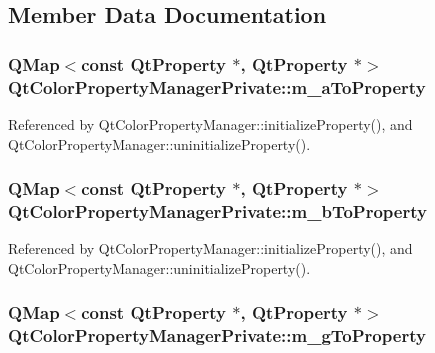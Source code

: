 \subsection{Member Data Documentation}
\subsubsection[{m\+\_\+a\+To\+Property}]{\setlength{\rightskip}{0pt plus 5cm}Q\+Map$<$const {\bf Qt\+Property} $\ast$, {\bf Qt\+Property} $\ast$$>$ Qt\+Color\+Property\+Manager\+Private\+::m\+\_\+a\+To\+Property}\label{classQtColorPropertyManagerPrivate_addd54ffbf9903145e5b3b307a0c8146d}


Referenced by Qt\+Color\+Property\+Manager\+::initialize\+Property(), and Qt\+Color\+Property\+Manager\+::uninitialize\+Property().

\subsubsection[{m\+\_\+b\+To\+Property}]{\setlength{\rightskip}{0pt plus 5cm}Q\+Map$<$const {\bf Qt\+Property} $\ast$, {\bf Qt\+Property} $\ast$$>$ Qt\+Color\+Property\+Manager\+Private\+::m\+\_\+b\+To\+Property}\label{classQtColorPropertyManagerPrivate_a32efe5c7ce4b3a8d637139ff7c07182e}


Referenced by Qt\+Color\+Property\+Manager\+::initialize\+Property(), and Qt\+Color\+Property\+Manager\+::uninitialize\+Property().

\subsubsection[{m\+\_\+g\+To\+Property}]{\setlength{\rightskip}{0pt plus 5cm}Q\+Map$<$const {\bf Qt\+Property} $\ast$, {\bf Qt\+Property} $\ast$$>$ Qt\+Color\+Property\+Manager\+Private\+::m\+\_\+g\+To\+Property}\label{classQtColorPropertyManagerPrivate_a603a1a5b6adebc46f28ec4efd5906f1e}


